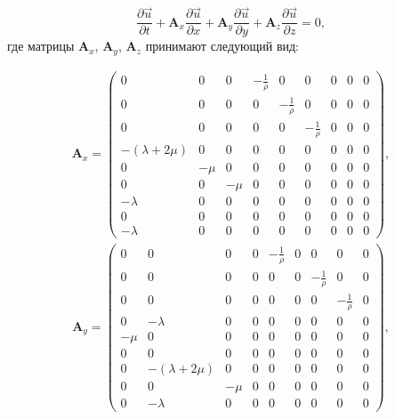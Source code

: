 \begin{equation}
	\label{simple_matrix_equation}
	\frac{\partial\vec{u}}{\partial{t}}+\mathbf{A}_x\frac{\partial\vec{u}}{\partial{x}}+
	\mathbf{A}_y\frac{\partial\vec{u}}{\partial{y}}+
	\mathbf{A}_z\frac{\partial\vec{u}}{\partial{z}}=0,
\end{equation}
где матрицы $\mathbf{A}_x$, $\mathbf{A}_y$, $\mathbf{A}_z$ принимают следующий вид:

\begin{align}
\label{isotropic_mat1}
\mathbf{A}_x =
\left( \begin{array}{cccccccccccc}
0 & 0 & 0 & -\frac 1 \rho & 0 & 0 & 0 & 0 & 0 \\ 
0 & 0 & 0 & 0 & -\frac 1 \rho & 0 & 0 & 0 & 0 \\ 
0 & 0 & 0 & 0 & 0 & -\frac 1 \rho & 0 & 0 & 0 \\ 
-(\lambda+2\mu) & 0 & 0 & 0 & 0 & 0 & 0 & 0 & 0 \\ 
0 & -\mu & 0 & 0 & 0 & 0 & 0 & 0 & 0 \\ 
0 & 0 & -\mu & 0 & 0 & 0 & 0 & 0 & 0 \\ 
-\lambda & 0 & 0 & 0 & 0 & 0 & 0 & 0 & 0 \\ 
0 & 0 & 0 & 0 & 0 & 0 & 0 & 0 & 0 \\ 
-\lambda & 0 & 0 & 0 & 0 & 0 & 0 & 0 & 0  
\end{array} \right),
\end{align} 
\begin{align}
\label{isotropic_mat2}
\mathbf{A}_y =
\left( \begin{array}{cccccccccccc}
0 & 0 & 0 & 0 & -\frac 1 \rho & 0 & 0 & 0 & 0 \\ 
0 & 0 & 0 & 0 & 0 & 0 & -\frac 1 \rho & 0 & 0 \\ 
0 & 0 & 0 & 0 & 0 & 0 & 0 & -\frac 1 \rho & 0 \\ 
0 & -\lambda & 0 & 0 & 0 & 0 & 0 & 0 & 0 \\ 
-\mu & 0 & 0 & 0 & 0 & 0 & 0 & 0 & 0 \\ 
0 & 0 & 0 & 0 & 0 & 0 & 0 & 0 & 0 \\ 
0 & -(\lambda+2\mu) & 0 & 0 & 0 & 0 & 0 & 0 & 0 \\ 
0 & 0 & -\mu & 0 & 0 & 0 & 0 & 0 & 0 \\ 
0 & -\lambda & 0 & 0 & 0 & 0 & 0 & 0 & 0  
\end{array} \right),
\end{align}
